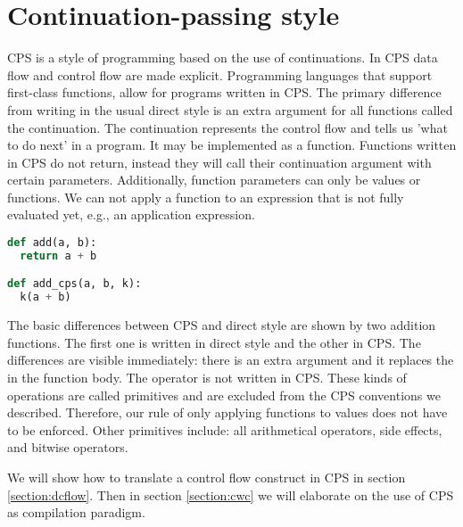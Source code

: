 
\chapter{\label{chap:cps}Continuation-passing style}
\ac{CPS}\autocite{steel1975scheme} is a style of programming based on the use of continuations. In \ac{CPS} data flow and control flow are made explicit. Programming languages that support first-class functions, allow for programs written in \ac{CPS}. The primary difference from writing in the usual direct style is an extra argument for all functions called the continuation. The continuation represents the control flow and tells us 'what to do next' in a program. It may be implemented as a function. Functions written in \ac{CPS} do not return, instead they will call their continuation argument with certain parameters. Additionally, function parameters can only be values or functions. We can not apply a function to an expression that is not fully evaluated yet, e.g., an application expression. 

\begin{lstlisting}[language=Python]
def add(a, b):
  return a + b

def add_cps(a, b, k):
  k(a + b)           
\end{lstlisting}

The basic differences between \ac{CPS} and direct style are shown by two addition functions. The first one is written in direct style and the other in \ac{CPS}. The differences are visible immediately: there is an extra argument  and it replaces the  in the function body. The \lstinlineb{+} operator is not written in \ac{CPS}. These kinds of operations are called primitives and are excluded from the \ac{CPS} conventions we described. Therefore, our rule of only applying functions to values does not have to be enforced. Other primitives include: all arithmetical operators, side effects, and bitwise operators.

We will show how to translate a control flow construct in \ac{CPS} in section \ref{section:dcflow}. Then in section \ref{section:cwc} we will elaborate on the use of \ac{CPS} as compilation paradigm.

